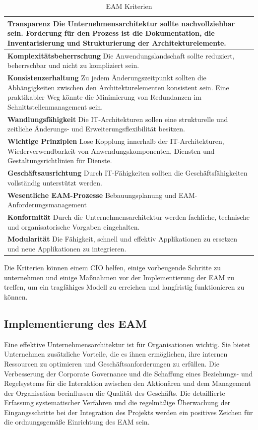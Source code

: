 \documentclass[
	doc,
	a4paper,
	helv
	]{apa6}
\begin{document}
\begin{table}[!h]
\caption{EAM Kriterien}
\begin{center}
\begin{tabularx}{\textwidth}{|X|}
\hline
\textbf{Transparenz}
Die Unternehmensarchitektur sollte nachvollziehbar sein.
Forderung für den Prozess ist die Dokumentation, die Inventarisierung und Strukturierung der Architekturelemente.
\\\hline
\textbf{Komplexitätsbeherrschung}
Die Anwendungslandschaft sollte reduziert, beherrschbar und nicht zu kompliziert sein.
\\\hline
\textbf{Konsistenzerhaltung}
Zu jedem Änderungszeitpunkt sollten die Abhängigkeiten zwischen den Architekturelementen konsistent sein.
Eine praktikabler Weg könnte die Minimierung von Redundanzen im Schnittstellenmanagement sein. 
\\\hline
\textbf{Wandlungsfähigkeit}
Die IT-Architekturen sollen eine strukturelle und zeitliche Änderungs- und Erweiterungsflexibilität besitzen. 
\\\hline
\textbf{Wichtige Prinzipien}
Lose Kopplung innerhalb der IT-Architekturen, Wiederverwendbarkeit von Anwendungskomponenten, Diensten und Gestaltungsrichtlinien für Dienste.
\\\hline
\textbf{Geschäftsausrichtung}
Durch IT-Fähigkeiten sollten die Geschäftsfähigkeiten vollständig unterstützt werden.
\\\hline
\textbf{Wesentliche EAM-Prozesse}
Bebauungsplanung und EAM-Anforderungsmanagement
\\\hline
\textbf{Konformität}
Durch die Unternehmensarchitektur werden fachliche, technische und organisatorische Vorgaben eingehalten.
\\\hline
\textbf{Modularität}
Die Fähigkeit, schnell und effektiv Applikationen zu ersetzen und neue Applikationen zu integrieren.
\\\hline
\end{tabularx}
\end{center}
\label{tab:EAM_Kriterien}
\end{table}

Die Kriterien können einem CIO helfen, einige vorbeugende Schritte zu unternehmen und einige Maßnahmen vor der Implementierung der EAM zu treffen, um ein tragfähiges Modell zu erreichen und langfristig funktionieren zu können.

\subsection{Implementierung des EAM}
Eine effektive Unternehmensarchitektur ist für Organisationen wichtig. Sie bietet Unternehmen zusätzliche Vorteile, die es ihnen ermöglichen, ihre internen Ressourcen zu optimieren und Geschäftsanforderungen zu erfüllen. Die Verbesserung der Corporate Governance und die Schaffung eines Beziehungs- und Regelsystems für die Interaktion zwischen den Aktionären und dem Management der Organisation beeinflussen die Qualität des Geschäfts. Die detaillierte Erfassung systematischer Verfahren und die regelmäßige Überwachung der Eingangsschritte bei der Integration des Projekts werden ein positives Zeichen für die ordnungsgemäße Einrichtung des EAM sein.
\end{document}
